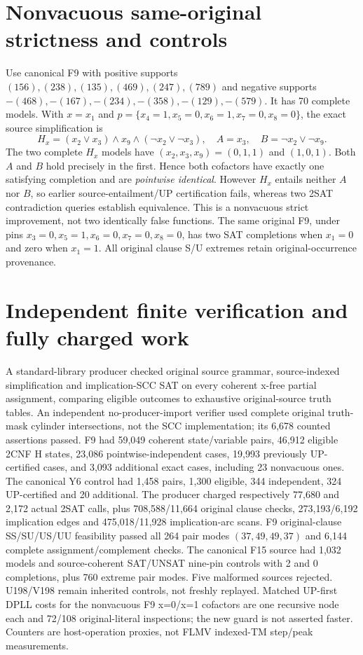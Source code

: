 \documentclass[11pt]{article}
\begin{document}
\section{Nonvacuous same-original strictness and controls}
Use canonical F9 with positive supports $(156),(238),(135),(469),(247),(789)$ and negative supports $-(468),-(167),-(234),-(358),-(129),-(579)$. It has 70 complete models. With $x=x_1$ and $p=\{x_4=1,x_5=0,x_6=1,x_7=0,x_8=0\}$, the exact source simplification is
\[
H_x=(x_2\lor x_3)\land x_9\land(\neg x_2\lor\neg x_3),\quad A=x_3,\quad B=\neg x_2\lor\neg x_9.
\]
The two complete $H_x$ models have $(x_2,x_3,x_9)=(0,1,1)$ and $(1,0,1)$. Both $A$ and $B$ hold precisely in the first. Hence both cofactors have exactly one satisfying completion and are \emph{pointwise identical}. However $H_x$ entails neither $A$ nor $B$, so earlier source-entailment/UP certification fails, whereas two 2SAT contradiction queries establish equivalence. This is a nonvacuous strict improvement, not two identically false functions.
The same original F9, under pins $x_3=0,x_5=1,x_6=0,x_7=0,x_8=0$, has two SAT completions when $x_1=0$ and zero when $x_1=1$. All original clause S/U extremes retain original-occurrence provenance.
\section{Independent finite verification and fully charged work}
A standard-library producer checked original source grammar, source-indexed simplification and implication-SCC SAT on every coherent x-free partial assignment, comparing eligible outcomes to exhaustive original-source truth tables. An independent no-producer-import verifier used complete original truth-mask cylinder intersections, not the SCC implementation; its 6,678 counted assertions passed. F9 had 59,049 coherent state/variable pairs, 46,912 eligible 2CNF H states, 23,086 pointwise-independent cases, 19,993 previously UP-certified cases, and 3,093 additional exact cases, including 23 nonvacuous ones. The canonical Y6 control had 1,458 pairs, 1,300 eligible, 344 independent, 324 UP-certified and 20 additional. The producer charged respectively 77,680 and 2,172 actual 2SAT calls, plus 708,588/11,664 original clause checks, 273,193/6,192 implication edges and 475,018/11,928 implication-arc scans. F9 original-clause SS/SU/US/UU feasibility passed all 264 pair modes $(37,49,49,37)$ and 6,144 complete assignment/complement checks. The canonical F15 source had 1,032 models and source-coherent SAT/UNSAT nine-pin controls with 2 and 0 completions, plus 760 extreme pair modes. Five malformed sources rejected. U198/V198 remain inherited controls, not freshly replayed. Matched UP-first DPLL costs for the nonvacuous F9 x=0/x=1 cofactors are one recursive node each and 72/108 original-literal inspections; the new guard is not asserted faster. Counters are host-operation proxies, not FLMV indexed-TM step/peak measurements.
\end{document}
